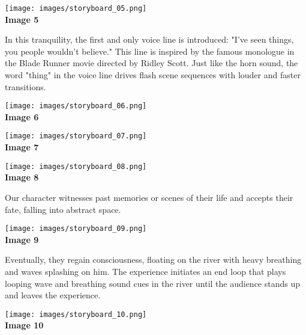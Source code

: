         \begin{center}
            \texttt{[image: images/storyboard\_05.png]}\\
            \textbf{Image 5}
        \end{center}

        In this tranquility, the first and only voice line is introduced: "I've seen things, you people wouldn't believe." This line is inspired by the famous monologue in the Blade Runner movie directed by Ridley Scott. Just like the horn sound, the word "thing" in the voice line drives flash scene sequences with louder and faster transitions.\par

        \begin{center}
            \texttt{[image: images/storyboard\_06.png]}\\
            \textbf{Image 6}
        \end{center}

        \begin{center}
            \texttt{[image: images/storyboard\_07.png]}\\
            \textbf{Image 7}
        \end{center}

        \begin{center}
            \texttt{[image: images/storyboard\_08.png]}\\
            \textbf{Image 8}
        \end{center}

        Our character witnesses past memories or scenes of their life and accepts their fate, falling into abstract space.\par

        \begin{center}
            \texttt{[image: images/storyboard\_09.png]}\\
            \textbf{Image 9}
        \end{center}

        Eventually, they regain consciousness, floating on the river with heavy breathing and waves splashing on him. The experience initiates an end loop that plays looping wave and breathing sound cues in the river until the audience stands up and leaves the experience.\par

        \begin{center}
            \texttt{[image: images/storyboard\_10.png]}\\
            \textbf{Image 10}
        \end{center}

